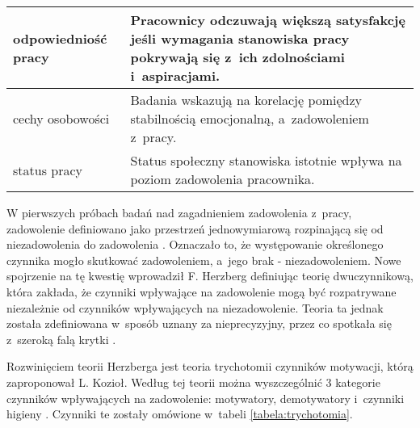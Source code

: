 \begin{minipage}{\textwidth}
\begin{table}[H]
\begin{center}
\begin{tabular}{|P{.2\textwidth}|P{.7\textwidth}|}
                         odpowiedniość pracy &
                         Pracownicy odczuwają większą satysfakcję jeśli wymagania stanowiska pracy pokrywają się z~ich zdolnościami i~aspiracjami. \\
                         \hline

                         cechy osobowości &
                         Badania wskazują na korelację pomiędzy stabilnością emocjonalną, a~zadowoleniem z~pracy. \\
                         \hline

                         status pracy &
                         Status społeczny stanowiska istotnie wpływa na poziom zadowolenia pracownika. \\
                         \hline
                     \end{tabular}
                 \end{center}
                 \raggedright{}
                 \vspace{0.75cm}
             \end{table}
\end{minipage}

W pierwszych próbach badań nad zagadnieniem zadowolenia z~pracy, zadowolenie definiowano jako przestrzeń jednowymiarową rozpinającą się od niezadowolenia do zadowolenia \cite{sowinska-2014}.
Oznaczało to, że występowanie określonego czynnika mogło skutkować zadowoleniem, a~jego brak - niezadowoleniem.
Nowe spojrzenie na tę kwestię wprowadził F. Herzberg definiując teorię dwuczynnikową,
która zakłada, że czynniki wpływające na zadowolenie mogą być rozpatrywane niezależnie od czynników wpływających na niezadowolenie.
Teoria ta jednak została zdefiniowana w~sposób uznany za nieprecyzyjny, przez co spotkała się z~szeroką falą krytki \cite{sowinska-2014}.

Rozwinięciem teorii Herzberga jest teoria trychotomii czynników motywacji, którą zaproponował L. Kozioł.
Według tej teorii można wyszczególnić 3 kategorie czynników wpływających na zadowolenie: motywatory, demotywatory i~czynniki higieny \cite{koziol-2011}.
Czynniki te zostały omówione w~tabeli \ref{tabela:trychotomia}.


